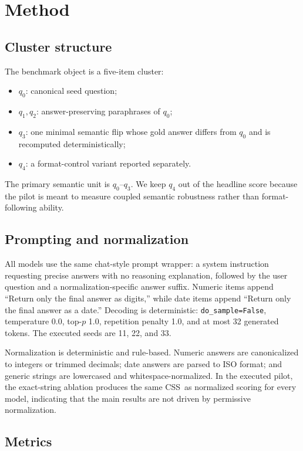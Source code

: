 \documentclass{article}
\newcommand{\css}{\textsc{CSS}}
\begin{document}
\section{Method}
\label{sec:method}

\subsection{Cluster structure}

The benchmark object is a five-item cluster:
\begin{itemize}[leftmargin=1.5em]
    \item $q_0$: canonical seed question;
    \item $q_1,q_2$: answer-preserving paraphrases of $q_0$;
    \item $q_3$: one minimal semantic flip whose gold answer differs from $q_0$ and is recomputed deterministically;
    \item $q_4$: a format-control variant reported separately.
\end{itemize}

The primary semantic unit is $q_0$--$q_3$. We keep $q_4$ out of the headline score because the pilot is meant to measure coupled semantic robustness rather than format-following ability.

\subsection{Prompting and normalization}

All models use the same chat-style prompt wrapper: a system instruction requesting precise answers with no reasoning explanation, followed by the user question and a normalization-specific answer suffix. Numeric items append ``Return only the final answer as digits,'' while date items append ``Return only the final answer as a date.'' Decoding is deterministic: \texttt{do\_sample=False}, temperature 0.0, top-$p$ 1.0, repetition penalty 1.0, and at most 32 generated tokens. The executed seeds are 11, 22, and 33.

Normalization is deterministic and rule-based. Numeric answers are canonicalized to integers or trimmed decimals; date answers are parsed to ISO format; and generic strings are lowercased and whitespace-normalized. In the executed pilot, the exact-string ablation produces the same \css\ as normalized scoring for every model, indicating that the main results are not driven by permissive normalization.

\subsection{Metrics}
\end{document}

